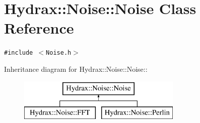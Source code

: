 \hypertarget{class_hydrax_1_1_noise_1_1_noise}{
\section{Hydrax::Noise::Noise Class Reference}
\label{class_hydrax_1_1_noise_1_1_noise}
}
{\tt \#include $<$Noise.h$>$}

Inheritance diagram for Hydrax::Noise::Noise::\begin{figure}[H]
\begin{center}
\leavevmode
\includegraphics[height=2cm]{class_hydrax_1_1_noise_1_1_noise}
\end{center}
\end{figure}
